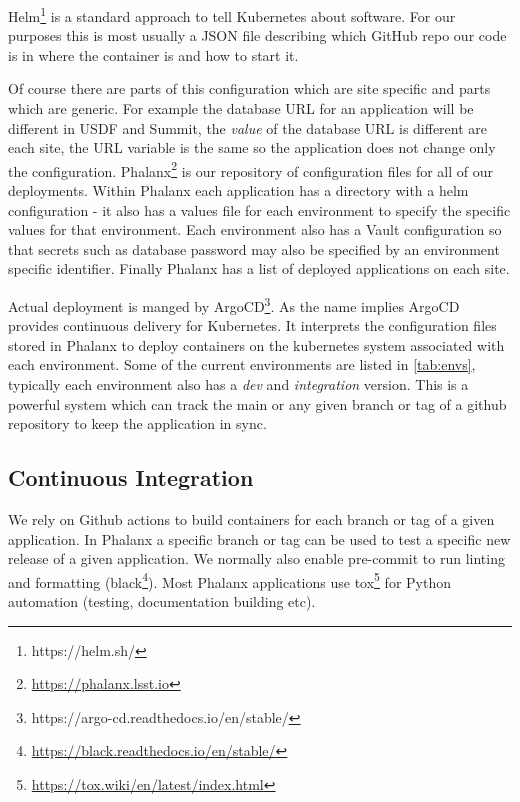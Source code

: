 Helm\footnote{https://helm.sh/} is a standard approach to tell Kubernetes about software.
For our purposes this is most usually a JSON file describing which GitHub repo our code is in where the container is and how to start it.

Of course there are parts of this configuration which are site specific and parts which are generic.
For example the database URL for an application will be different in USDF and Summit, the \emph{value} of the database URL is different are each site, the URL variable is the same so the application does not change only the configuration.
Phalanx\footnote{\url{https://phalanx.lsst.io}} is our repository of configuration files for all of our deployments.
Within Phalanx each application has a directory with a helm configuration - it also has a values file for each environment to specify the specific values for that environment.
Each environment also has a Vault configuration so that secrets such as database password may also be specified by an environment specific identifier.
Finally Phalanx has a list of deployed applications on each site.

Actual deployment is manged by ArgoCD\footnote{https://argo-cd.readthedocs.io/en/stable/}.
As the name implies ArgoCD provides continuous delivery for Kubernetes.
It interprets the configuration files stored in Phalanx to deploy containers on the kubernetes system associated with each environment.
Some of the current environments are listed in \autoref{tab:envs}, typically each environment also has a \emph{dev} and \emph{integration} version.
This is a powerful system which can track the main or any given branch or tag of a github repository to keep the application in sync.


\subsection{Continuous Integration}
We rely on Github actions to build containers for each branch or tag of a given application.
In Phalanx a specific branch or tag can be used to test a specific new release of a given application.
We normally also enable pre-commit to run linting and formatting (black\footnote{\url{https://black.readthedocs.io/en/stable/}}).
Most Phalanx applications use tox\footnote{\url{https://tox.wiki/en/latest/index.html}} for Python automation (testing, documentation building etc).

